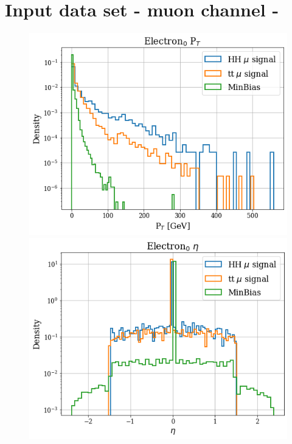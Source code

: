 \documentclass[../main.tex]{subfiles}
\begin{document}
\section{Input data set - muon channel -}
\begin{figure}[!ht] 
  \begin{minipage}[b]{0.33\linewidth}
    \centering
    \includegraphics[width=1\linewidth]{Chapters/Plots/Hist_1mu_electron0_Et.png}
\end{minipage}%
  \begin{minipage}[b]{0.33\linewidth}
    \centering
    \includegraphics[width=1\linewidth]{Chapters/Plots/Hist_1mu_electron0_Eta.png}

\end{minipage}
\end{figure}
\end{document}
